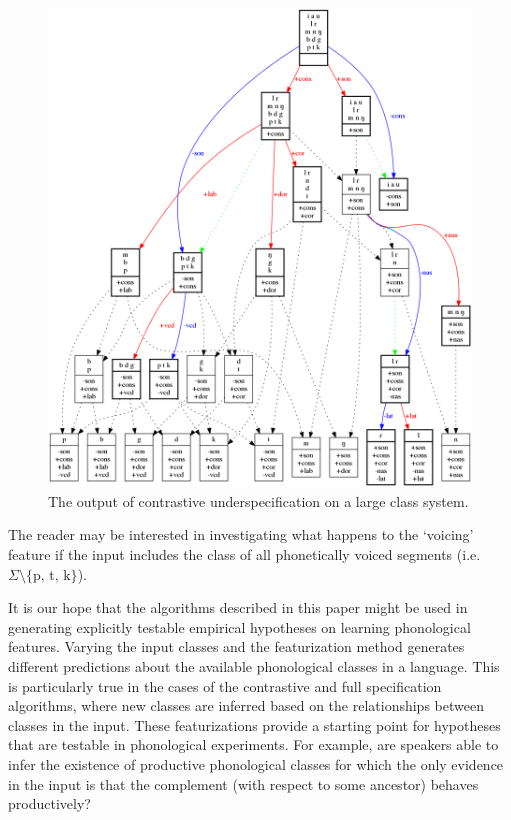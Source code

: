 \documentclass[11pt, oneside]{article}   	%
\begin{document}
\begin{figure}[htb!]
  \centering
  \includegraphics[width=\textwidth]{biggun.png}
  \caption{The output of contrastive underspecification on a large class system. }
  \label{fig:big_alphabet}
\end{figure}

The reader may be interested in investigating what happens to the `voicing' feature if the input includes the class of all phonetically voiced segments (i.e. $\Sigma \setminus \text{\{p, t, k\}}$).

It is our hope that the algorithms described in this paper might be used in generating explicitly testable empirical hypotheses on learning phonological features. Varying the input classes and the featurization method generates different predictions about the available phonological classes in a language. This is particularly true in the cases of the contrastive and full specification algorithms, where new classes are inferred based on the relationships between classes in the input. These featurizations provide a starting point for hypotheses that are testable in phonological experiments. For example, are speakers able to infer the existence of productive phonological classes for which the only evidence in the input is that the complement (with respect to some ancestor) behaves productively? 
\end{document}
